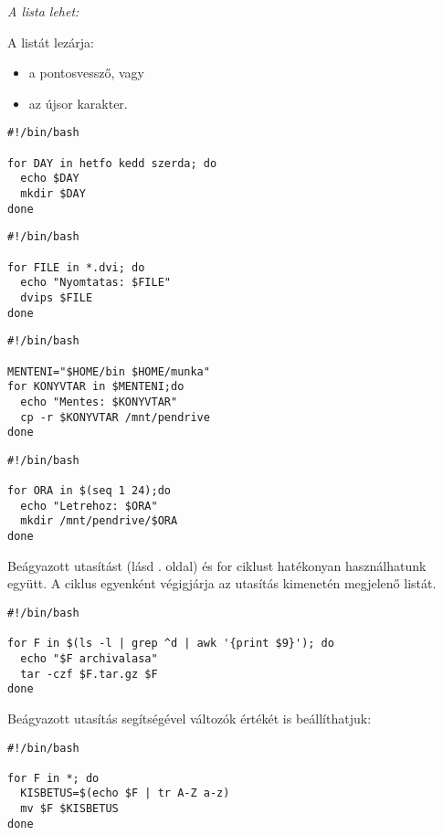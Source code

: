 \emph{A lista lehet:}
A listát lezárja:
\begin{itemize}
\item a pontosvessző, vagy
\item az újsor karakter.
\end{itemize}


\begin{lstlisting}
#!/bin/bash

for DAY in hetfo kedd szerda; do
  echo $DAY
  mkdir $DAY
done
\end{lstlisting}
\begin{lstlisting}
#!/bin/bash

for FILE in *.dvi; do
  echo "Nyomtatas: $FILE"
  dvips $FILE
done
\end{lstlisting}

\begin{lstlisting}
#!/bin/bash

MENTENI="$HOME/bin $HOME/munka"
for KONYVTAR in $MENTENI;do
  echo "Mentes: $KONYVTAR"
  cp -r $KONYVTAR /mnt/pendrive
done
\end{lstlisting}

\begin{lstlisting}
#!/bin/bash

for ORA in $(seq 1 24);do
  echo "Letrehoz: $ORA"
  mkdir /mnt/pendrive/$ORA
done
\end{lstlisting}

Beágyazott utasítást (lásd \pageref{beagyazott}. oldal) és for ciklust hatékonyan használhatunk együtt. 
A ciklus egyenként végigjárja az utasítás kimenetén megjelenő listát.
\begin{lstlisting}
#!/bin/bash

for F in $(ls -l | grep ^d | awk '{print $9}'); do
  echo "$F archivalasa"
  tar -czf $F.tar.gz $F
done
\end{lstlisting}

Beágyazott utasítás segítségével változók értékét is beállíthatjuk:
\begin{lstlisting}
#!/bin/bash

for F in *; do
  KISBETUS=$(echo $F | tr A-Z a-z)
  mv $F $KISBETUS
done
\end{lstlisting}

